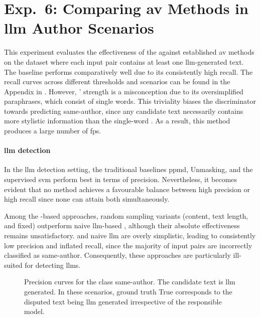 \section{Exp.\ 6: Comparing \acs{av} Methods in \acs{llm} Author Scenarios}
\label{sec:results_llm_av}

This experiment evaluates the effectiveness of the \impAppr{} against established \ac{av} methods on the \dataArtificialStudent{} dataset where each input pair contains at least one \ac{llm}-generated text.  
The baseline \mirrorMinds{} performs comparatively well due to its consistently high recall.  
The recall curves across different thresholds and scenarios can be found in the Appendix in .  
However, \mirrorMinds{}' strength is a misconception due to its oversimplified paraphrases, which consist of single words.  
This triviality biases the discriminator towards predicting same-author, since any candidate text necessarily contains more stylistic information than the single-word \imps{}.  
As a result, this method produces a large number of \acp{fp}.


\paragraph{\ac{llm} detection}

In the \ac{llm} detection setting, the traditional baselines \ac{ppmd}, Unmasking, and the supervised \ac{svm} perform best in terms of precision.  
Nevertheless, it becomes evident that no method achieves a favourable balance between high precision or high recall since none can attain both simultaneously.  

Among the \imp{}-based approaches, random sampling variants (content, text length, and fixed) outperform naive \ac{llm}-based \imps{}, although their absolute effectiveness remains unsatisfactory.  
\mirrorMinds{} and naive \ac{llm} \imps{} are overly simplistic, leading to consistently low precision and inflated recall, since the majority of input pairs are incorrectly classified as same-author.  
Consequently, these approaches are particularly ill-suited for detecting \acp{llm}.

\begin{figure}[h]
  
\caption[\ac{llm} detection precision curves.]{Precision curves for the class same-author. 
The candidate text is \ac{llm} generated.
In these scenarios, ground truth True corresponds to the disputed text being \ac{llm} generated irrespective of the responsible model.
}
\label{fig:llm_detection_prec}
\end{figure}

